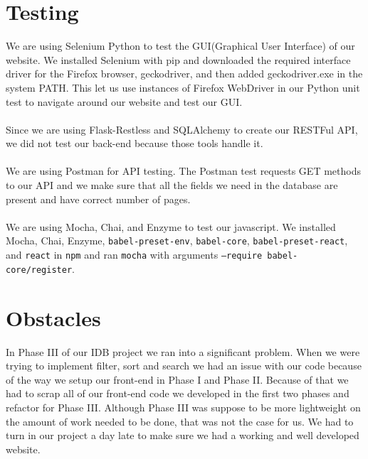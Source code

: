 \documentclass[12pt]{article}
\newcommand{\code}[1]{\texttt{#1}}
\begin{document}
\section{Testing}

We are using Selenium Python to test the GUI(Graphical User Interface) of our website. We installed Selenium with pip and downloaded the required interface driver for the Firefox browser, geckodriver, and then added geckodriver.exe in the system PATH. This let us use instances of Firefox WebDriver in our Python unit test to navigate around our website and test our GUI.
\\
\\
Since we are using Flask-Restless and SQLAlchemy to create our RESTFul API, we did not test our back-end because those tools handle it.
\\
\\
We are using Postman for API testing. The Postman test requests GET methods to our API and we make sure that all the fields we need in the database are present and have correct number of pages. 
\\
\\
We are using Mocha, Chai, and Enzyme to test our javascript. We installed Mocha, Chai, Enzyme, \code{babel-preset-env}, \code{babel-core}, \code{babel-preset-react}, and \code{react} in \code{npm} and ran \code{mocha} with arguments \code{--require babel-core/register}.

\section{Obstacles}
In Phase III of our IDB project we ran into a significant problem. When we were trying to implement filter, sort and search we had an issue with our code because of the way we setup our front-end in Phase I and Phase II. Because of that we had to scrap all of our front-end code we developed in the first two phases and refactor for Phase III. Although Phase III was suppose to be more lightweight on the amount of work needed to be done, that was not the case for us. We had to turn in our project a day late to make sure we had a working and well developed website.
\end{document}
